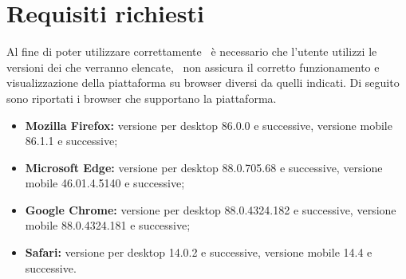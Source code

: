 \section{Requisiti richiesti}\label{Requisiti}
Al fine di poter utilizzare correttamente \NomeProgetto\ è necessario che l'utente utilizzi le versioni dei  che verranno elencate, \Gruppo\ non assicura il corretto funzionamento e visualizzazione della piattaforma su browser diversi da quelli indicati.
Di seguito sono riportati i browser che supportano la piattaforma.
\begin{itemize}
	\item \textbf{Mozilla Firefox:} versione per desktop 86.0.0 e successive, versione mobile 86.1.1 e successive;
	\item \textbf{Microsoft Edge:} versione per desktop 88.0.705.68 e successive, versione mobile 46.01.4.5140 e successive;
	\item \textbf{Google Chrome:} versione per desktop 88.0.4324.182 e successive, versione mobile 88.0.4324.181 e successive;
	\item \textbf{Safari:} versione per desktop 14.0.2 e successive, versione mobile 14.4 e successive.
\end{itemize}